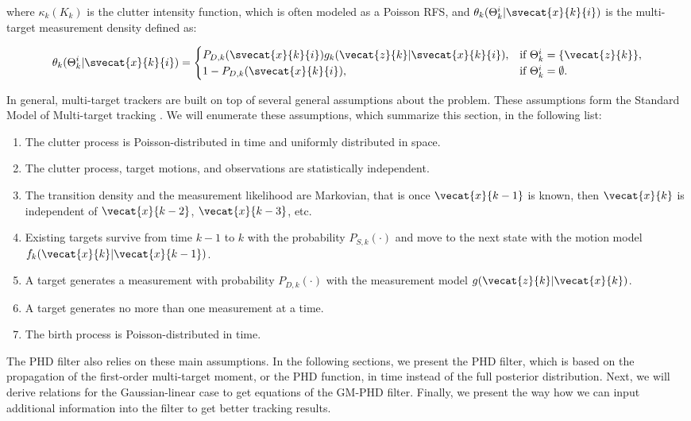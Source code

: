 \noindent where $\kappa_k(K_k)$ is the clutter intensity function, which is often modeled as a Poisson RFS, and $\theta_{k}(\Theta_{k}^i | \svecat{x}{k}{i})$ is the multi-target measurement density defined as:

\begin{equation}
    \theta_k(\Theta_{k}^i | \svecat{x}{k}{i}) = \begin{cases}
        P_{D,k}(\svecat{x}{k}{i})
            g_k(\vecat{z}{k} | \svecat{x}{k}{i}), & \text{if } \Theta_{k}^i = \{\vecat{z}{k}\}, \\
            1 - P_{D,k}(\svecat{x}{k}{i}), & \text{if } \Theta_{k}^i = \emptyset.
    \end{cases}
\end{equation}

In general, multi-target trackers are built on top of several general assumptions about the problem. These assumptions form the Standard Model of Multi-target tracking \cite[311--313]{mahlerStatisticalMultisourcemultitargetInformation2007}. We will enumerate these assumptions, which summarize this section, in the following list:

\begin{enumerate}
    \item The clutter process is Poisson-distributed in time and uniformly distributed in space.
    \item The clutter process, target motions, and observations are statistically independent.
    \item The transition density and the measurement likelihood are Markovian, that is once $\vecat{x}{k-1}$ is known, then $\vecat{x}{k}$ is independent of $\vecat{x}{k-2}$, $\vecat{x}{k-3}$, etc.
    \item Existing targets survive from time $k-1$ to $k$ with the probability $P_{S,k}(\cdot)$ and move to the next state with the motion model $f_k(\vecat{x}{k} | \vecat{x}{k-1})$.
    \item A target generates a measurement with probability $P_{D,k}(\cdot)$ with the measurement model $g(\vecat{z}{k} | \vecat{x}{k})$.
    \item A target generates no more than one measurement at a time.
    \item The birth process is Poisson-distributed in time.
\end{enumerate}

The PHD filter also relies on these main assumptions. In the following sections, we present the PHD filter, which is based on the propagation of the first-order multi-target moment, or the PHD function, in time instead of the full posterior distribution. Next, we will derive relations for the Gaussian-linear case to get equations of the GM-PHD filter. Finally, we present the way how we can input additional information into the filter to get better tracking results.
